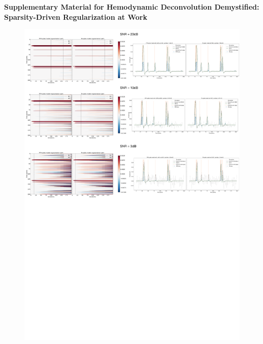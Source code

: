 \pagebreak
\begin{center}
\textbf{\large Supplementary Material for Hemodynamic Deconvolution Demystified: Sparsity-Driven Regularization at Work}
\end{center}
\setcounter{equation}{0}
\setcounter{figure}{0}
\setcounter{table}{0}
\setcounter{page}{1}
\makeatletter
\renewcommand{\theequation}{S\arabic{equation}}
\renewcommand{\thefigure}{S\arabic{figure}}
\renewcommand{\bibnumfmt}[1]{[S#1]}
\renewcommand{\citenumfont}[1]{S#1}


\begin{figure}[h!]
    \begin{center}
        \includegraphics[width=\textwidth]{figures/regpath_spike.pdf}

\end{center}
\end{figure}
